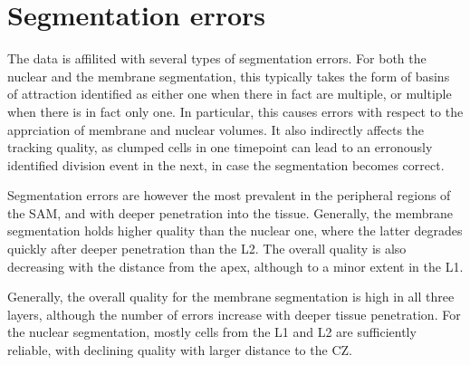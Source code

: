 \section{Segmentation errors}
\label{sec:data_errors_segmentation}
The data is affilited with several types of segmentation errors. For both the
nuclear and the membrane segmentation, this typically takes the form of basins
of attraction identified as either one when there in fact are multiple, or
multiple when there is in fact only one. In particular, this causes errors with
respect to the apprciation of membrane and nuclear volumes. It also indirectly
affects the tracking quality, as clumped cells in one timepoint can lead to an
erronously identified division event in the next, in case the segmentation
becomes correct. 

Segmentation errors are however the most prevalent in the peripheral regions of
the SAM, and with deeper penetration into the tissue. Generally, the membrane
segmentation holds higher quality than the nuclear one, where the latter
degrades quickly after deeper penetration than the L2. The overall quality is
also decreasing with the distance from the apex, although to a minor extent in
the L1. 

Generally, the overall quality for the membrane segmentation is high in all
three layers, although the number of errors increase with deeper tissue
penetration. For the nuclear segmentation, mostly cells from the L1 and L2 are
sufficiently reliable, with declining quality with larger distance to the CZ. 










